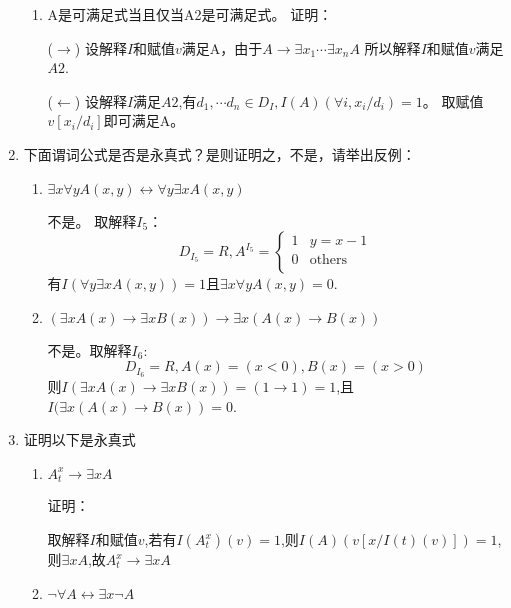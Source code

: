 \documentclass[UTF8]{ctexart}
\begin{document}
\begin{enumerate}
\begin{enumerate}
            \item A是可满足式当且仅当A2是可满足式。
            证明：

            ($\rightarrow$) 设解释$I$和赋值$v$满足A，由于$A\rightarrow \exists x_1\cdots \exists x_n A$
            所以解释$I$和赋值$v$满足$A2$.

            ($\leftarrow$) 设解释$I$满足$A2$,有$d_1,\cdots d_n\in D_I,I(A)(\forall i,x_i/d_i)=1$。
            取赋值$v[x_i/d_i]$即可满足A。
        \end{enumerate}
        
        \item 下面谓词公式是否是永真式？是则证明之，不是，请举出反例：
        \begin{enumerate}
            \item $\exists x\forall yA(x,y)\leftrightarrow \forall y\exists xA(x,y)$
            
            不是。
            取解释$I_5$：
            \[
                D_{I_5}=R,A^{I_5}=\begin{cases}
                    1 & y=x-1\\
                    0 & \text{others}\\
                \end{cases}
            \]
            有$I(\forall y \exists xA(x,y))=1$且$\exists x \forall yA(x,y)=0$.

            \item $(\exists xA(x)\rightarrow \exists xB(x))\rightarrow \exists x(A(x)\rightarrow B(x))$
        
            不是。取解释$I_6$:
            \[
                D_{I_6}=R,A(x)=(x<0),B(x)=(x>0)
            \]
            则$I(\exists xA(x)\rightarrow \exists xB(x))=(1 \rightarrow 1)=1$,且
            $I(\exists x(A(x)\rightarrow B(x))=0$.
        \end{enumerate}

        \item 证明以下是永真式
        \begin{enumerate}
            \item $A_t^x\rightarrow \exists x A$
            
            证明：

            取解释$I$和赋值$v$,若有$I(A_t^x)(v)=1$,则$I(A)(v[x/I(t)(v)])=1$,则$\exists xA$,故$A_t^x\rightarrow \exists xA$

            \item $\neg \forall A \leftrightarrow \exists x \neg A$
            

\end{enumerate}
\end{enumerate}
\end{document}
